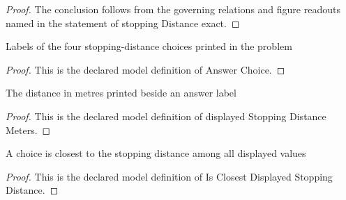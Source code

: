 \begin{proof}
  The conclusion follows from the governing relations and figure readouts named in the statement of stopping Distance exact.
\end{proof}
\begin{definition}
  \label{def:physics:phyx-mini-0674:phyxminiproblems-problemphyxmini0674-answerchoice}
  Labels of the four stopping-distance choices printed in the problem
\end{definition}
\begin{proof}
  This is the declared model definition of Answer Choice.
\end{proof}
\begin{definition}
  \label{def:physics:phyx-mini-0674:phyxminiproblems-problemphyxmini0674-displayedstoppingdistancemeters}
  The distance in metres printed beside an answer label
\end{definition}
\begin{proof}
  This is the declared model definition of displayed Stopping Distance Meters.
\end{proof}
\begin{definition}
  \label{def:physics:phyx-mini-0674:phyxminiproblems-problemphyxmini0674-isclosestdisplayedstoppingdistance}
  A choice is closest to the stopping distance among all displayed values
\end{definition}
\begin{proof}
  This is the declared model definition of Is Closest Displayed Stopping Distance.
\end{proof}
